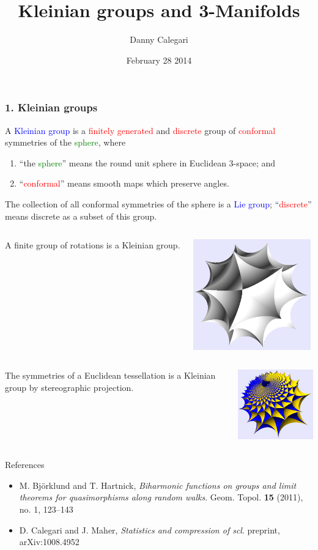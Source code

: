\documentclass{beamer}
\title{Kleinian groups and 3-Manifolds}
\author{Danny Calegari}
\date{February 28 2014}
\begin{document}
\frame{\titlepage}
\frame
{
\frametitle{1. Kleinian groups}

A \textcolor{blue}{Kleinian group} is a \textcolor{red}{finitely generated} and 
\textcolor{red}{discrete} group of \textcolor{red}{conformal} symmetries of the 
\textcolor{green}{sphere}, where

\begin{enumerate}
\item{``the \textcolor{green}{sphere}'' means the round unit sphere in Euclidean 3-space; and}
\item{``\textcolor{red}{conformal}'' means smooth maps which preserve angles.}
\end{enumerate}

The collection of all conformal symmetries of the sphere is a \textcolor{blue}{Lie group}; ``\textcolor{red}{discrete}''
means discrete as a subset of this group.
}
\frame
{
\begin{columns}[c]
\column{1in}
A finite group of
rotations is a Kleinian group.
\column{2in}
\begin{center}
\includegraphics[width=2in]{icosahedron.png}
\end{center}
\end{columns}
}
\frame
{
\begin{columns}[c]
\column{1.1in}
The symmetries of a 
Euclidean tessellation
is a Kleinian group
by stereographic
projection.
\column{2in}
\begin{center}
\includegraphics[width=2in]{parabolic.png}
\end{center}
\end{columns}
}
\frame
{
\begin{block}{References}
\begin{itemize}
\item{M. Bj\"orklund and T. Hartnick, {\em Biharmonic functions on groups 
and limit theorems for quasimorphisms along random walks}.
Geom. Topol. {\bf 15} (2011), no. 1, 123--143}
\item{D. Calegari and J. Maher, {\em Statistics and compression of scl}.
preprint, arXiv:1008.4952}
\end{itemize}
\end{block}
}
\end{document}
